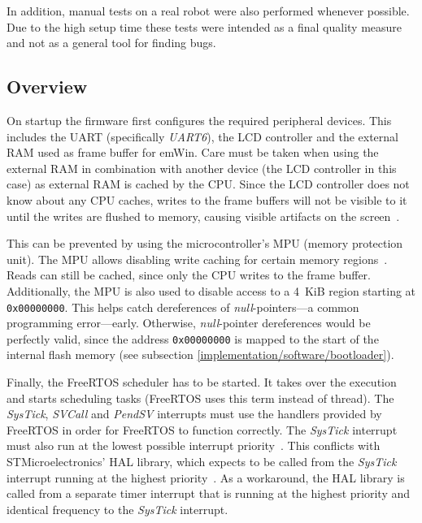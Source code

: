 In addition, manual tests on a real robot were also performed whenever possible. Due to the high
setup time these tests were intended as a final quality measure and not as a general tool for finding
bugs.

\subsection{Overview}
\label{implementation/software/overview}

On startup the firmware first configures the required peripheral devices. This includes the UART
(specifically \textit{UART6}), the LCD controller and the external RAM used as frame buffer for emWin.
Care must be taken when using the external RAM in combination with another device (the LCD controller
in this case) as external RAM is cached by the CPU. Since the LCD controller does not know about
any CPU caches, writes to the frame buffers will not be visible to it until the writes are flushed
to memory, causing visible artifacts on the screen~\cite{mcu-ref-manual}.

This can be prevented by using the microcontroller's MPU (memory protection unit). The MPU allows
disabling write caching for certain memory regions~\cite{mcu-ref-manual}. Reads can still be cached,
since only the CPU writes to the frame buffer. Additionally, the MPU is also used to disable access
to a \SI{4}{KiB} region starting at \lstinline{0x00000000}. This helps catch dereferences of 
\textit{null}-pointers---a common programming error---early. Otherwise, \textit{null}-pointer
dereferences would be perfectly valid, since the address \lstinline{0x00000000} is mapped to the
start of the internal flash memory (see subsection \ref{implementation/software/bootloader}).

Finally, the FreeRTOS scheduler has to be started. It takes over the execution and starts scheduling
tasks (FreeRTOS uses this term instead of thread). The \textit{SysTick}, \textit{SVCall} and
\textit{PendSV} interrupts must use the handlers provided by FreeRTOS in order for FreeRTOS to
function correctly. The \textit{SysTick} interrupt must also run at the lowest possible interrupt
priority~\cite{freertos-arm-cortex-m}. This conflicts with STMicroelectronics' HAL library, which
expects to be called from the \textit{SysTick} interrupt running at the highest priority~\cite{stm32-hal-docs}.
As a workaround, the HAL library is called from a separate timer interrupt that is running at the
highest priority and identical frequency to the \textit{SysTick} interrupt.

